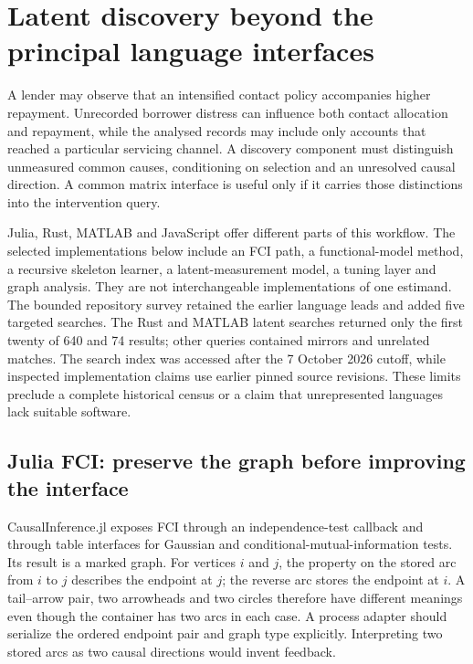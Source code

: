 \hypertarget{latent-discovery-beyond-the-principal-language-interfaces}{%
\section{Latent discovery beyond the principal language
interfaces}\label{latent-discovery-beyond-the-principal-language-interfaces}}

\label{exec14:other-latent}

A lender may observe that an intensified contact policy accompanies
higher repayment. Unrecorded borrower distress can influence both
contact allocation and repayment, while the analysed records may include
only accounts that reached a particular servicing channel. A discovery
component must distinguish unmeasured common causes, conditioning on
selection and an unresolved causal direction. A common matrix interface
is useful only if it carries those distinctions into the intervention
query.

Julia, Rust, MATLAB and JavaScript offer different parts of this
workflow. The selected implementations below include an FCI path, a
functional-model method, a recursive skeleton learner, a
latent-measurement model, a tuning layer and graph analysis. They are
not interchangeable implementations of one estimand. The bounded
repository survey retained the earlier language leads and added five
targeted searches. The Rust and MATLAB latent searches returned only the
first twenty of 640 and 74 results; other queries contained mirrors and
unrelated matches. The search index was accessed after the 7 October
2026 cutoff, while inspected implementation claims use earlier pinned
source revisions. These limits preclude a complete historical census or
a claim that unrepresented languages lack suitable software.
\citep{exec14_olatent_search}

\hypertarget{julia-fci-preserve-the-graph-before-improving-the-interface}{%
\subsection{Julia FCI: preserve the graph before improving the
interface}\label{julia-fci-preserve-the-graph-before-improving-the-interface}}

CausalInference.jl exposes FCI through an independence-test callback and
through table interfaces for Gaussian and conditional-mutual-information
tests. Its result is a marked graph. For vertices \(i\) and \(j\), the
property on the stored arc from \(i\) to \(j\) describes the endpoint at
\(j\); the reverse arc stores the endpoint at \(i\). A tail--arrow pair,
two arrowheads and two circles therefore have different meanings even
though the container has two arcs in each case. A process adapter should
serialize the ordered endpoint pair and graph type explicitly.
Interpreting two stored arcs as two causal directions would invent
feedback. \citep{exec14_olatent_causalinference}

